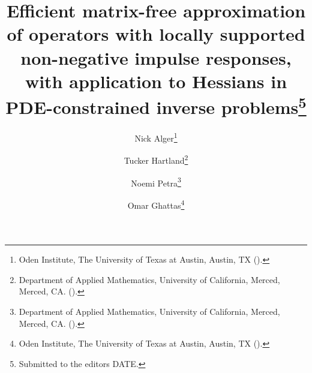 

\usepackage{lipsum}
\usepackage{amsfonts}
\usepackage{graphicx}
\usepackage{epstopdf}
\usepackage{amsmath}
\usepackage[algo2e, ruled, noend, linesnumbered]{algorithm2e}
\usepackage{bm}
\ifpdf
\else
\fi

\newcommand{\creflastconjunction}{, and~}
\newcommand{\nor}[1]{\left\|#1\right\|}



\newcommand{\norm}[1]{\|#1\|}



\title{Efficient matrix-free approximation of operators with locally supported non-negative impulse responses, with application to Hessians in PDE-constrained inverse problems\thanks{Submitted to the editors DATE.
}}

\author{Nick Alger\thanks{Oden Institute, The University of Texas at Austin, Austin, TX 
  ().}
\and Tucker Hartland\thanks{Department of Applied Mathematics, University of California, Merced, Merced, CA. 
	().}
\and Noemi Petra\thanks{Department of Applied Mathematics, University of California, Merced, Merced, CA. 
  ().}
\and Omar Ghattas\thanks{Oden Institute, The University of Texas at Austin, Austin, TX 
	().}}

